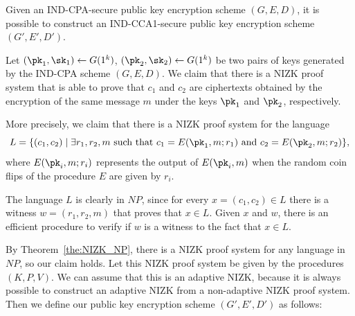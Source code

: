 \documentclass[12pt]{tufte-book}
\begin{document}
\begin{theorem}
Given an IND-CPA-secure public key encryption scheme $(G,E,D)$, it is possible
to construct an IND-CCA1-secure public key encryption scheme $(G',E',D')$.
\end{theorem}
\proof
Let $(\pk_1,\sk_1)\leftarrow G(1^k)$, $(\pk_2,\sk_2)\leftarrow G(1^k)$ be two pairs
of keys generated by the IND-CPA scheme $(G,E,D)$.
We claim that there is a NIZK proof system that is
able to prove that $c_1$ and $c_2$ are ciphertexts obtained by the encryption
of the same message $m$ under the keys $\pk_1$ and $\pk_2$, respectively.

More precisely, we claim that there is a NIZK proof system for the language
$$L = \{(c_1,c_2) \mid \text{$\exists r_1,r_2,m$ such that $c_1=E(\pk_1,m;r_1)$ and
$c_2=E(\pk_2,m;r_2)$}\},$$
where $E(\pk_i,m;r_i)$ represents the output of $E(\pk_i,m)$ when the random coin flips
of the procedure $E$ are given by $r_i$.

The language $L$ is clearly in $NP$, since for every $x=(c_1,c_2)\in L$ there is a witness
$w=(r_1,r_2,m)$ that proves that $x\in L$. Given $x$ and $w$, there is an efficient procedure
to verify if $w$ is a witness to the fact that $x\in L$.

By Theorem~\ref{the:NIZK_NP}, there is a NIZK proof system for any language in $NP$, so our
claim holds.
Let this NIZK proof system be given by the procedures $(K,P,V)$.
We can assume that this is an adaptive NIZK, because it is always possible to construct an
adaptive NIZK from a non-adaptive NIZK proof system.
Then we define our public key encryption scheme $(G',E',D')$ as follows:
\end{document}

